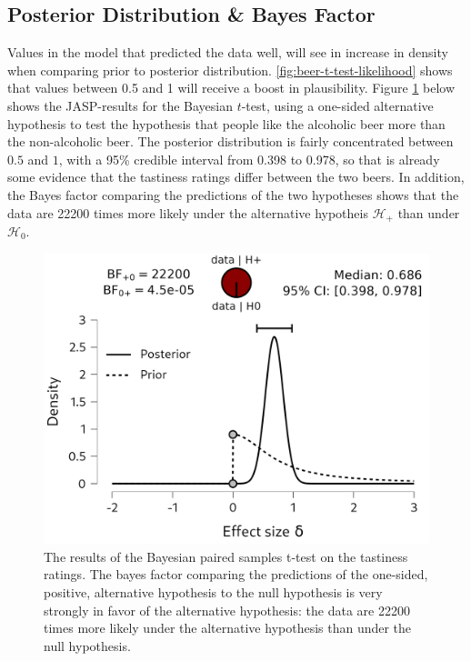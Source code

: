 \documentclass[
]{book}
\begin{document}
\hypertarget{posterior-distribution-bayes-factor}{%
\subsection{Posterior Distribution \& Bayes Factor}\label{posterior-distribution-bayes-factor}}

Values in the model that predicted the data well, will see in increase in density when comparing prior to posterior distribution. \ref{fig:beer-t-test-likelihood} shows that values between 0.5 and 1 will receive a boost in plausibility. Figure \ref{fig:beer-tastiness-t-test-posterior} below shows the JASP-results for the Bayesian \(t\)-test, using a one-sided alternative hypothesis to test the hypothesis that people like the alcoholic beer more than the non-alcoholic beer. The posterior distribution is fairly concentrated between \(0.5\) and \(1\), with a 95\% credible interval from 0.398 to 0.978, so that is already some evidence that the tastiness ratings differ between the two beers. In addition, the Bayes factor comparing the predictions of the two hypotheses shows that the data are 22200 times more likely under the alternative hypotheis \(\mathcal{H}_{+}\) than under \(\mathcal{H}_{0}\).

\begin{figure}

{\centering \includegraphics[width=1\linewidth]{Figures/TTestBeerTastiness} 

}

\caption{The results of the Bayesian paired samples t-test on the tastiness ratings. The bayes factor comparing the predictions of the one-sided, positive, alternative hypothesis to the null hypothesis is very strongly in favor of the alternative hypothesis:  the data are 22200 times more likely under the alternative hypothesis than under the null hypothesis.}\label{fig:beer-tastiness-t-test-posterior}
\end{figure}
\end{document}
